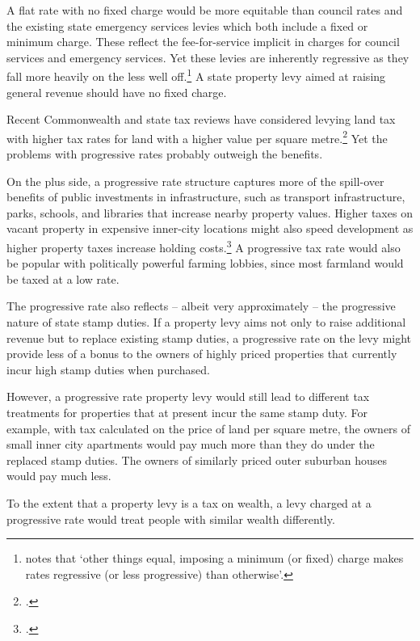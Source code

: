 \documentclass[twoside,english]{palatinob5portrait}
\begin{document}
A flat rate with no fixed charge would be more equitable than council rates and the existing state emergency services levies which both include a fixed or minimum charge. These reflect the fee-for-service implicit in charges for council services and emergency services. Yet these levies are inherently regressive as they fall more heavily on the less well off.\footnote{\textcite[][139]{productivity2008assessing}  notes that ‘other things equal, imposing a minimum (or fixed) charge makes rates regressive (or less progressive) than otherwise’.}  A state property levy aimed at raising general revenue should have no fixed charge.

Recent Commonwealth and state tax reviews have considered levying land tax with higher tax rates for land with a higher value per square metre.\footcites[][265]{HenryTaxReview2010}[][41]{GovernmentSouthAustralia2015-State-Tax-Review-Discussion-Paper}  Yet the problems with progressive rates probably outweigh the benefits.

On the plus side, a progressive rate structure captures more of the spill-over benefits of public investments in infrastructure, such as transport infrastructure, parks, schools, and libraries that increase nearby property values. Higher taxes on vacant property in expensive inner-city locations might also speed development as higher property taxes increase holding costs.\footcite{WoodOngCigdemEtAl2012}  A progressive tax rate would also be popular with politically powerful farming lobbies, since most farmland would be taxed at a low rate.

The progressive rate also reflects – albeit very approximately – the progressive nature of state stamp duties. If a property levy aims not only to raise additional revenue but to replace existing stamp duties, a progressive rate on the levy might provide less of a bonus to the owners of highly priced properties that currently incur high stamp duties when purchased.

However, a progressive rate property levy would still lead to different tax treatments for properties that at present incur the same stamp duty. For example, with tax calculated on the price of land per square metre, the owners of small inner city apartments would pay much more than they do under the replaced stamp duties. The owners of similarly priced outer suburban houses would pay much less. 

To the extent that a property levy is a tax on wealth, a levy charged at a progressive rate would treat people with similar wealth differently. 
\end{document}
